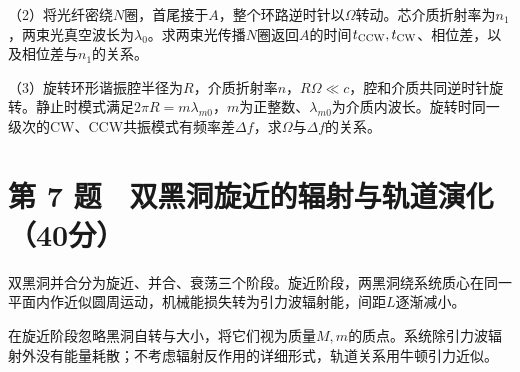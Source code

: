 \documentclass[12pt,a4paper,fontset=fandol]{ctexart}
\begin{document}
\begin{center}
\begin{minipage}{\linewidth}
\centering\begingroup{}
\ifdim\wd\diagrambox>.88\linewidth
\sbox{\diagrambox}{\resizebox{.88\linewidth}{!}{\usebox{\diagrambox}}}\fi
\ifdim\ht\diagrambox>.20\textheight
\resizebox{!}{.20\textheight}{\usebox{\diagrambox}}
\else\usebox{\diagrambox}\fi
\par{}\endgroup\end{minipage}\end{center}

（2）将光纤密绕\(N\)圈，首尾接于\(A\)，整个环路逆时针以\(\Omega\)转动。芯介质折射率为\(n_1\)，两束光真空波长为\(\lambda_0\)。求两束光传播\(N\)圈返回\(A\)的时间\(t_{\rm CCW},t_{\rm CW}\)、相位差，以及相位差与\(n_1\)的关系。

（3）旋转环形谐振腔半径为\(R\)，介质折射率\(n\)，\(R\Omega\ll c\)，腔和介质共同逆时针旋转。静止时模式满足\(2\pi R=m\lambda_{m0}\)，\(m\)为正整数、\(\lambda_{m0}\)为介质内波长。旋转时同一级次的CW、CCW共振模式有频率差\(\Delta f\)，求\(\Omega\)与\(\Delta f\)的关系。

\clearpage

\section{第 7
题　双黑洞旋近的辐射与轨道演化（40分）}\label{ux7b2c-7-ux9898-ux53ccux9ed1ux6d1eux65cbux8fd1ux7684ux8f90ux5c04ux4e0eux8f68ux9053ux6f14ux531640ux5206}

双黑洞并合分为旋近、并合、衰荡三个阶段。旋近阶段，两黑洞绕系统质心在同一平面内作近似圆周运动，机械能损失转为引力波辐射能，间距\(L\)逐渐减小。

在旋近阶段忽略黑洞自转与大小，将它们视为质量\(M,m\)的质点。系统除引力波辐射外没有能量耗散；不考虑辐射反作用的详细形式，轨道关系用牛顿引力近似。
\end{document}
